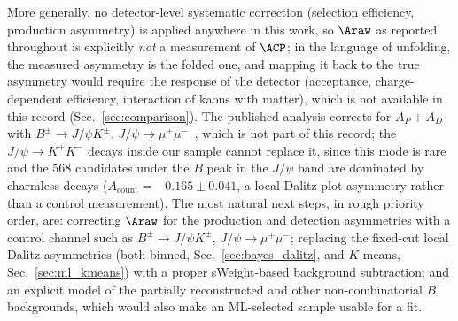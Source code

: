 More generally, no detector-level systematic correction (selection efficiency, production asymmetry) is applied anywhere in this work, so $\Araw$ as reported throughout is explicitly \emph{not} a measurement of $\ACP$; in the language of unfolding, the measured asymmetry is the folded one, and mapping it back to the true asymmetry would require the response of the detector (acceptance, charge-dependent efficiency, interaction of kaons with matter), which is not available in this record (Sec.~\ref{sec:comparison}). The published analysis corrects for $A_P+A_D$ with $B^\pm\to J/\psi K^\pm$, $J/\psi\to\mu^+\mu^-$~\cite{lhcb_cpv_prd2023}, which is not part of this record; the $J/\psi\to K^+K^-$ decays inside our sample cannot replace it, since this mode is rare and the $568$ candidates under the $B$ peak in the $J/\psi$ band are dominated by charmless decays ($A_{\mathrm{count}}=-0.165\pm0.041$, a local Dalitz-plot asymmetry rather than a control measurement).
The most natural next steps, in rough priority order, are: correcting $\Araw$ for the production and detection asymmetries with a control channel such as $B^\pm\to J/\psi K^\pm$, $J/\psi\to\mu^+\mu^-$; replacing the fixed-cut local Dalitz asymmetries (both binned, Sec.~\ref{sec:bayes_dalitz}, and $K$-means, Sec.~\ref{sec:ml_kmeans}) with a proper sWeight-based background subtraction; and an explicit model of the partially reconstructed and other non-combinatorial $B$ backgrounds, which would also make an ML-selected sample usable for a fit.
\FloatBarrier
